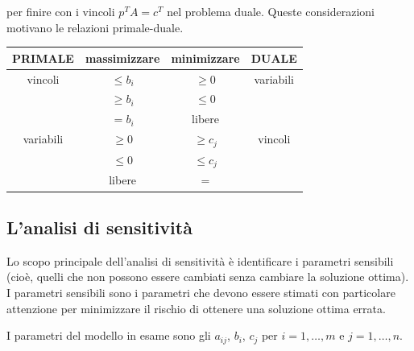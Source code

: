 \documentclass[a4paper, 11pt]{article}
\begin{document}
        per finire con i vincoli $p^T A = c^T$ nel problema duale. Queste considerazioni motivano le relazioni primale-duale.

        \begin{table}[h!]
            \centering
            \begin{tabular}{|c|c||c|c|}
            \hline
            PRIMALE & massimizzare & minimizzare & DUALE \\
            \hline
            vincoli & $\leq b_i$ & $\geq 0$ & variabili \\
             & $\geq b_i$ & $\leq 0$ & \\
             & $= b_i$ & libere & \\
            \hline
            variabili & $\geq 0$ & $\geq c_j$ & vincoli \\
             & $\leq 0$ & $\leq c_j$ & \\
             & libere & $=$ & \\
            \hline
            \end{tabular}
        \end{table}



        \subsection{L'analisi di sensitività}

        Lo scopo principale dell'analisi di sensitività è identificare i parametri sensibili (cioè, quelli che non possono essere cambiati senza cambiare la soluzione ottima). I parametri sensibili sono i parametri che devono essere stimati con particolare attenzione per minimizzare il rischio di ottenere una soluzione ottima errata.

        I parametri del modello in esame sono gli $a_{ij}$, $b_i$, $c_j$ per $i = 1, \dots, m$ e $j = 1, \dots, n$.

        
        
\end{document}
